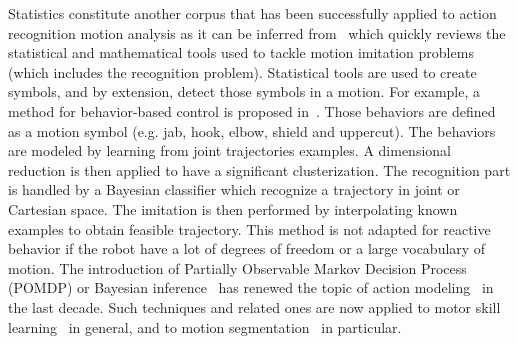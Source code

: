 \documentclass[letterpaper, 10pt, conference]{ieeeconf}      %
\begin{document}
%
Statistics constitute another corpus that has been successfully applied
to action recognition motion analysis as it can be inferred 
from~\cite{schaal03} which quickly reviews the statistical and mathematical 
tools used to tackle motion imitation problems (which includes the recognition problem).
Statistical tools are used to create symbols, and by extension, detect those
symbols in a motion. For example, a method for behavior-based control 
is proposed in~\cite{drumwright03, drumwright04}. Those behaviors are defined 
as a motion symbol (e.g. jab, hook, elbow, shield and uppercut). 
The behaviors are modeled by learning from joint trajectories examples.
A dimensional reduction is then applied to have a significant
clusterization.  The recognition part is handled by a Bayesian classifier which
recognize a trajectory in joint or Cartesian space. The imitation is then
performed by interpolating known examples to obtain feasible trajectory.  This
method is not adapted for reactive behavior if the robot have a lot of degrees
of freedom or a large vocabulary of motion.
The introduction of Partially
Observable Markov Decision Process (POMDP) or Bayesian inference~\cite{pearl88} has
renewed the topic of action modeling~\cite{kaelbling98} in the last decade. Such
techniques and related ones are now applied to motor skill learning~\cite{peters08} in
general, and to motion segmentation~\cite{calinon10, inamura04} in particular. 
\end{document}
